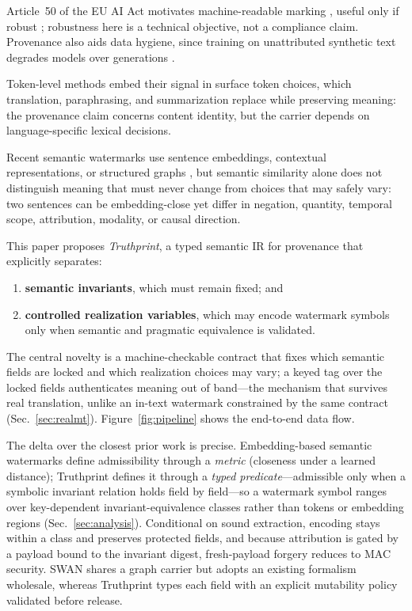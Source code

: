 \documentclass[11pt]{article}
\begin{document}
Article~50 of the EU AI Act motivates machine-readable marking \cite{euaiact2024}, useful only if robust \cite{liu2024survey}; robustness here is a technical objective, not a compliance claim. Provenance also aids data hygiene, since training on unattributed synthetic text degrades models over generations \cite{shumailov2024collapse}.

Token-level methods embed their signal in surface token choices, which translation, paraphrasing, and summarization replace while preserving meaning: the provenance claim concerns content identity, but the carrier depends on language-specific lexical decisions.

Recent semantic watermarks use sentence embeddings, contextual representations, or structured graphs \cite{hou2024semstamp,ren2024semmark,liu2023sir,ye2026swan,schaefer2026dew}, but semantic similarity alone does not distinguish meaning that must never change from choices that may safely vary: two sentences can be embedding-close yet differ in negation, quantity, temporal scope, attribution, modality, or causal direction.

This paper proposes \emph{Truthprint}, a typed semantic IR for provenance that explicitly separates:
\begin{enumerate}[leftmargin=*]
  \item \textbf{semantic invariants}, which must remain fixed; and
  \item \textbf{controlled realization variables}, which may encode watermark symbols only when semantic and pragmatic equivalence is validated.
\end{enumerate}

The central novelty is a machine-checkable contract that fixes which semantic fields are locked and which realization choices may vary; a keyed tag over the locked fields authenticates meaning out of band---the mechanism that survives real translation, unlike an in-text watermark constrained by the same contract (Sec.~\ref{sec:realmt}). Figure~\ref{fig:pipeline} shows the end-to-end data flow.

The delta over the closest prior work is precise. Embedding-based semantic watermarks \cite{hou2024semstamp,ren2024semmark,liu2023sir,schaefer2026dew} define admissibility through a \emph{metric} (closeness under a learned distance); Truthprint defines it through a \emph{typed predicate}---admissible only when a symbolic invariant relation holds field by field---so a watermark symbol ranges over key-dependent invariant-equivalence classes rather than tokens or embedding regions (Sec.~\ref{sec:analysis}). Conditional on sound extraction, encoding stays within a class and preserves protected fields, and because attribution is gated by a payload bound to the invariant digest, fresh-payload forgery reduces to MAC security. SWAN \cite{ye2026swan} shares a graph carrier but adopts an existing formalism wholesale, whereas Truthprint types each field with an explicit mutability policy validated before release.
\end{document}
